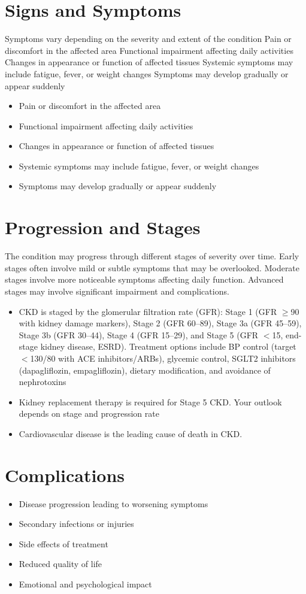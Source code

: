 \section{Signs and Symptoms}
Symptoms vary depending on the severity and extent of the condition Pain or discomfort in the affected area Functional impairment affecting daily activities Changes in appearance or function of affected tissues Systemic symptoms may include fatigue, fever, or weight changes Symptoms may develop gradually or appear suddenly

\begin{itemize}[noitemsep]
  \item Pain or discomfort in the affected area
  \item Functional impairment affecting daily activities
  \item Changes in appearance or function of affected tissues
  \item Systemic symptoms may include fatigue, fever, or weight changes
  \item Symptoms may develop gradually or appear suddenly
\end{itemize}
\section{Progression and Stages}
The condition may progress through different stages of severity over time. Early stages often involve mild or subtle symptoms that may be overlooked. Moderate stages involve more noticeable symptoms affecting daily function. Advanced stages may involve significant impairment and complications.

\begin{itemize}[noitemsep]
  \item CKD is staged by the glomerular filtration rate (GFR): Stage 1 (GFR $\geq$90 with kidney damage markers), Stage 2 (GFR 60--89), Stage 3a (GFR 45--59), Stage 3b (GFR 30--44), Stage 4 (GFR 15--29), and Stage 5 (GFR $<$15, end-stage kidney disease, ESRD). Treatment options include BP control (target $<$130/80 with ACE inhibitors/ARBs), glycemic control, SGLT2 inhibitors (dapagliflozin, empagliflozin), dietary modification, and avoidance of nephrotoxins
  \item Kidney replacement therapy is required for Stage 5 CKD. Your outlook depends on stage and progression rate
  \item Cardiovascular disease is the leading cause of death in CKD.
\end{itemize}
\section{Complications}
\begin{itemize}[noitemsep]
  \item Disease progression leading to worsening symptoms
  \item Secondary infections or injuries
  \item Side effects of treatment
  \item Reduced quality of life
  \item Emotional and psychological impact
\end{itemize}
